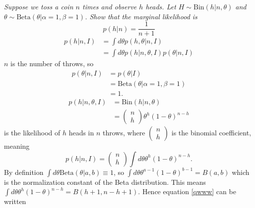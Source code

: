 \begin{example}
	\emph{Suppose we toss a coin $n$ times and observe $h$ heads. Let $H\sim \text{Bin}(h|n,\theta)$ and $\theta\sim \text{Beta}(\theta |\alpha =1,\beta = 1)$. Show that the marginal likelihood is}
	\begin{equation}
		p(h|n)=\frac{1}{n+1}
	\end{equation}
	\begin{equation}
		\begin{split}
			p(h|n,I)&=\int d\theta p(h,\theta|n,I) \\
			&= \int d\theta p(h|n,\theta,I)p(\theta|n,I)
		\end{split}
	\end{equation}
	$n$ is the number of throws, so
	\begin{equation}
		\begin{split}
			p(\theta|n,I) &= p(\theta|I)\\
			&=\text{Beta}(\theta |\alpha =1,\beta = 1)\\
			&=1.
		\end{split}
	\end{equation}
	\begin{equation}
		\begin{split}
			p(h|n,\theta,I) &= \text{Bin}(h|n,\theta)\\
			&=
			\begin{pmatrix}
				n \\
				h
			\end{pmatrix} \theta^h(1-\theta)^{n-h}
		\end{split}
	\end{equation}
	is the likelihood of $h$ heads in $n$ throws, where $\begin{pmatrix}
		n \\
		h
	\end{pmatrix}$ is the binomial coefficient, meaning
	\begin{equation}
		p(h|n,I)= \begin{pmatrix}
			n \\
			h
		\end{pmatrix}\int d\theta \theta^h(1-\theta)^{n-h}.
		\label{qwww}
	\end{equation}
	By definition $\int d\theta \text{Beta}(\theta|a,b) \equiv 1$, so $\int d\theta \theta^{a-1}(1-\theta)^{b-1}= B(a,b)$ which is the normalization constant of the Beta distribution. This means $\int d\theta \theta^h(1-\theta)^{n-h}=B(h+1,n-h+1)$. Hence equation \eqref{qwww} can be written

\end{example}
